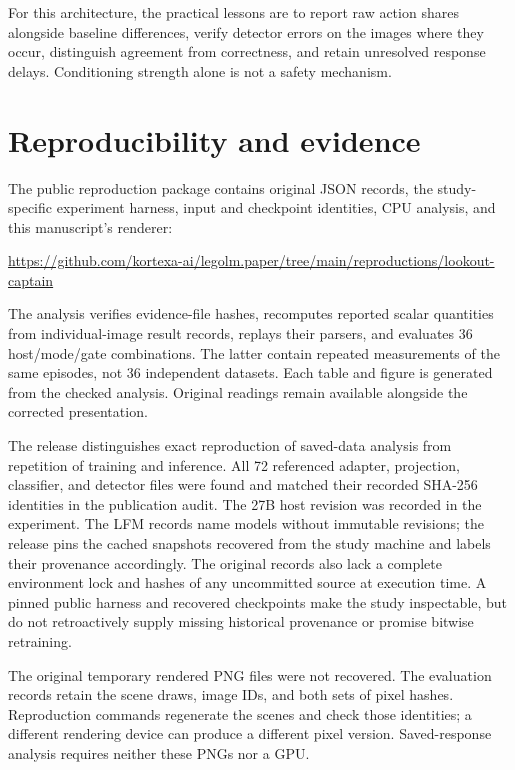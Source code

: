 \documentclass[10pt]{article}
\begin{document}
For this architecture, the practical lessons are to report
raw action shares alongside baseline differences, verify
detector errors on the images where they occur, distinguish
agreement from correctness, and retain unresolved response
delays. Conditioning strength alone is not a safety mechanism.

\section{Reproducibility and evidence}
The public reproduction package contains \EvidenceFiles{} original
JSON records, the study-specific experiment harness, input and
checkpoint identities, CPU analysis, and this manuscript's
renderer:
\begin{center}
\url{https://github.com/kortexa-ai/legolm.paper/tree/main/reproductions/lookout-captain}
\end{center}
The analysis verifies evidence-file hashes, recomputes
\ScalarChecks{} reported scalar quantities from
\AuditedImageRecords{} individual-image result records, replays
their parsers, and evaluates 36 host/mode/gate combinations.
The latter contain repeated measurements of the same episodes,
not 36 independent datasets. Each table and figure is generated
from the checked analysis. Original readings remain available
alongside the corrected presentation.

The release distinguishes exact reproduction of saved-data
analysis from repetition of training and inference. All 72
referenced adapter, projection, classifier, and detector files
were found and matched their recorded SHA-256 identities in
the publication audit. The 27B host revision was recorded in
the experiment. The LFM records name models without immutable
revisions; the release pins the cached snapshots recovered
from the study machine and labels their provenance accordingly.
The original records also lack a complete environment lock
and hashes of any uncommitted source at execution time.
A pinned public harness and recovered checkpoints make the
study inspectable, but do not retroactively supply missing
historical provenance or promise bitwise retraining.

The original temporary rendered PNG files were not recovered.
The evaluation records retain the scene draws, image IDs, and
both sets of pixel hashes. Reproduction commands regenerate
the scenes and check those identities; a different rendering
device can produce a different pixel version. Saved-response
analysis requires neither these PNGs nor a GPU.
\end{document}
